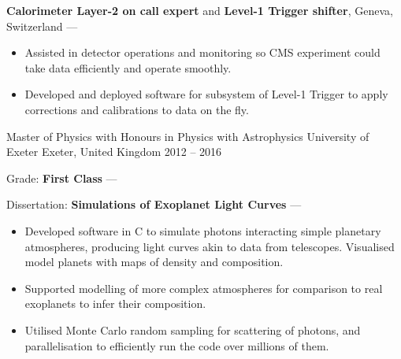 \begin{cventries}
{\begin{cvitems}
            \vpaddingEduNorm
            \item {\textbf{Calorimeter Layer-2 on call expert} and \textbf{Level-1 Trigger shifter}, Geneva, Switzerland --- }
            \vpaddingEduSubpoint
            \begin{itemize}
                \item[\bullet]{Assisted in detector operations and monitoring so CMS experiment could take data efficiently and operate smoothly.}
                \vpaddingEduSubpoint
                \item[\bullet]{Developed and deployed software for subsystem of Level-1 Trigger to apply corrections and calibrations to data on the fly.}
            \end{itemize}
        \end{cvitems}
        }

    \cventry
        {Master of Physics with Honours in Physics with Astrophysics}
        {University of Exeter}
        {Exeter, United Kingdom}
        {2012 -- 2016}
        {
        \begin{cvitems} %
            \item {Grade: \textbf{First Class} --- }
            \vpaddingEduNorm
            \item {Dissertation: \textbf{Simulations of Exoplanet Light Curves} --- }
            \vpaddingEduSubpoint
            \begin{itemize}
                \item[\bullet]{Developed software in C to simulate photons interacting simple planetary atmospheres, producing light curves akin to data from telescopes. Visualised model planets with maps of density and composition.}
                \vpaddingEduSubpoint
                \item[\bullet]{Supported modelling of more complex atmospheres for comparison to real exoplanets to infer their composition.}
                \vpaddingEduSubpoint
                \item[\bullet]{Utilised Monte Carlo random sampling for scattering of photons, and parallelisation to efficiently run the code over millions of them.}
            \end{itemize}
        \end{cvitems}
        } %


\end{cventries}
